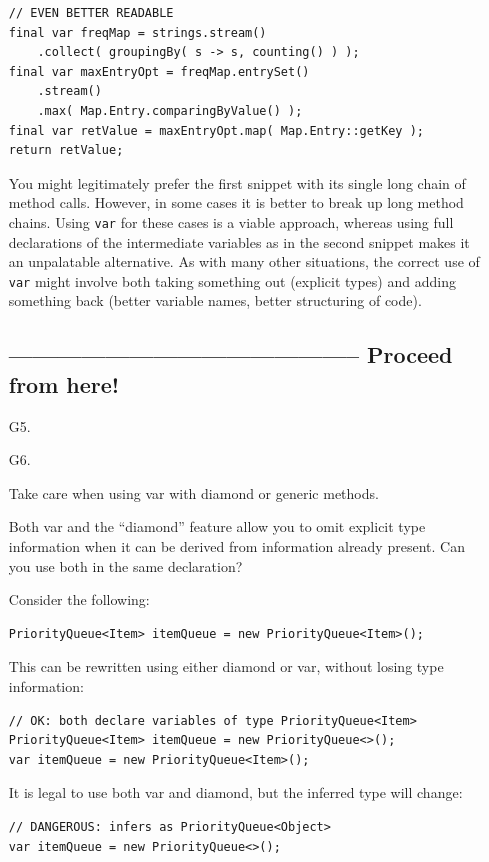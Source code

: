 \documentclass[11pt,a4paper, titlepage, parskip=half, headsepline, footsepline, cleardoublepage=current, headheight=1cm]{scrbook}
\begin{document}
\begin{enumerate}
{\begin{lstlisting}
// EVEN BETTER READABLE
final var freqMap = strings.stream()
    .collect( groupingBy( s -> s, counting() ) );
final var maxEntryOpt = freqMap.entrySet()
    .stream()
    .max( Map.Entry.comparingByValue() );
final var retValue = maxEntryOpt.map( Map.Entry::getKey );
return retValue;
\end{lstlisting}

You might legitimately prefer the first snippet with its single long chain of method calls. However, in some cases it is better to break up long method chains. Using \lstinline|var| for these cases is a viable approach, whereas using full declarations of the intermediate variables as in the second snippet makes it an unpalatable alternative. As with many other situations, the correct use of \lstinline|var| might involve both taking something out (explicit types) and adding something back (better variable names, better structuring of code).}

\subsection{-------------------------------------------- Proceed from here!}
\item[G5.]{}

\item[G6.]{Take care when using var with diamond or generic methods.

Both var and the “diamond” feature allow you to omit explicit type information when it can be derived from information already present. Can you use both in the same declaration?

Consider the following:

\begin{lstlisting}
PriorityQueue<Item> itemQueue = new PriorityQueue<Item>();
\end{lstlisting}
This can be rewritten using either diamond or var, without losing type information:

\begin{lstlisting}
// OK: both declare variables of type PriorityQueue<Item>
PriorityQueue<Item> itemQueue = new PriorityQueue<>();
var itemQueue = new PriorityQueue<Item>();
\end{lstlisting}

It is legal to use both var and diamond, but the inferred type will change:

\begin{lstlisting}
// DANGEROUS: infers as PriorityQueue<Object>
var itemQueue = new PriorityQueue<>();
\end{lstlisting}

}
\end{enumerate}
\end{document}
